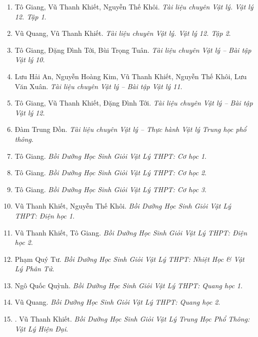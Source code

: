 \documentclass{article}
\begin{document}
\begin{enumerate}	
	\item Tô Giang, Vũ Thanh Khiết, Nguyễn Thế Khôi. {\it Tài liệu chuyên Vật lý. Vật lý 12. Tập 1}.
	
	\item Vũ Quang, Vũ Thanh Khiết. {\it Tài liệu chuyên Vật lý. Vật lý 12. Tập 2}.
	
	\item Tô Giang, Đặng Đình Tới, Bùi Trọng Tuân. {\it Tài liệu chuyên Vật lý -- Bài tập Vật lý 10}.
	
	\item Lưu Hải An, Nguyễn Hoàng Kim, Vũ Thanh Khiết, Nguyễn Thế Khôi, Lưu Văn Xuân. {\it Tài liệu chuyên Vật lý -- Bài tập Vật lý 11}.
	
	\item Tô Giang, Vũ Thanh Khiết, Đặng Đình Tới. {\it Tài liệu chuyên Vật lý -- Bài tập Vật lý 12}.
	
	\item Đàm Trung Đồn. {\it Tài liệu chuyên Vật lý -- Thực hành Vật lý Trung học phổ thông}.
	
	\item Tô Giang. {\it Bồi Dưỡng Học Sinh Giỏi Vật Lý THPT: Cơ học 1}.\hfill{\sf[reading]}
	
	\item Tô Giang. {\it Bồi Dưỡng Học Sinh Giỏi Vật Lý THPT: Cơ học 2}.\hfill{\sf[reading]}
	
	\item Tô Giang. {\it Bồi Dưỡng Học Sinh Giỏi Vật Lý THPT: Cơ học 3}.\hfill{\sf[reading]}
	
	\item Vũ Thanh Khiết, Nguyễn Thế Khôi. {\it Bồi Dưỡng Học Sinh Giỏi Vật Lý THPT: Điện học 1}.\hfill{\sf[reading]}
	
	\item Vũ Thanh Khiết, Tô Giang. {\it Bồi Dưỡng Học Sinh Giỏi Vật Lý THPT: Điện học 2}.\hfill{\sf[reading]}
	
	\item Phạm Quý Tư. {\it Bồi Dưỡng Học Sinh Giỏi Vật Lý THPT: Nhiệt Học \& Vật Lý Phân Tử}.
	
	\item Ngô Quốc Quỳnh. {\it Bồi Dưỡng Học Sinh Giỏi Vật Lý THPT: Quang học 1}.\hfill{\sf[reading]}
	
	\item Vũ Quang. {\it Bồi Dưỡng Học Sinh Giỏi Vật Lý THPT: Quang học 2}.
	\item \cite{Khiet_Vat_Ly_hien_dai}. Vũ Thanh Khiết. {\it Bồi Dưỡng Học Sinh Giỏi Vật Lý Trung Học Phổ Thông: Vật Lý Hiện Đại}.\hfill{\sf[reading]}
	

\end{enumerate}
\end{document}
